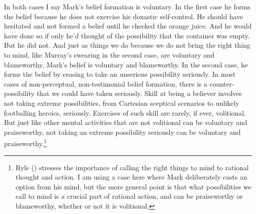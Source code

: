 \documentclass[
  10pt,
  letterpaper,
  DIV=11,
  numbers=noendperiod,
  twoside]{scrartcl}
\begin{document}
In both cases I say Mark's belief formation is voluntary. In the first
case he forms the belief because he does not exercise his doxastic
self-control. He should have hesitated and not formed a belief until he
checked the orange juice. And he would have done so if only he'd thought
of the possibility that the container was empty. But he did not. And
just as things we do because we do not bring the right thing to mind,
like Murray's swearing in the second case, are voluntary and
blameworthy, Mark's belief is voluntary and blameworthy. In the second
case, he forms the belief by ceasing to take an unserious possibility
seriously. In most cases of non-perceptual, non-testimonial belief
formation, there is a counter-possibility that we could have taken
seriously. Skill at being a believer involves not taking extreme
possibilities, from Cartesian sceptical scenarios to unlikely
footballing heroics, seriously. Exercises of such skill are rarely, if
ever, volitional. But just like other mental activities that are not
volitional can be voluntary and praiseworthy, not taking an extreme
possibility seriously can be voluntary and praiseworthy.\footnote{Ryle
  () stresses the importance of
  calling the right things to mind to rational thought and action. I am
  using a case here where Mark deliberately casts an option from his
  mind, but the more general point is that what possibilities we call to
  mind is a crucial part of rational action, and can be praiseworthy or
  blameworthy, whether or not it is volitional.}
\end{document}
